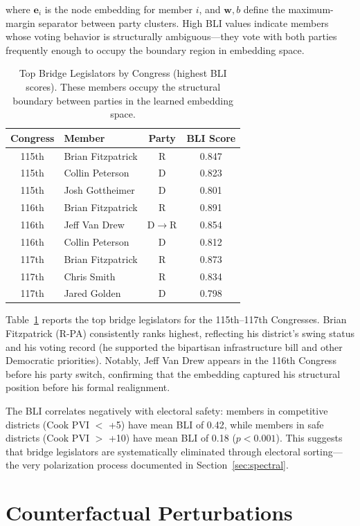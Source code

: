 \documentclass[11pt]{article}
\begin{document}
where $\mathbf{e}_i$ is the node embedding for member $i$, and $\mathbf{w}, b$ define the maximum-margin separator between party clusters. High BLI values indicate members whose voting behavior is structurally ambiguous---they vote with both parties frequently enough to occupy the boundary region in embedding space.

\begin{table}[H]
\centering
\caption{Top Bridge Legislators by Congress (highest BLI scores). These members occupy the structural boundary between parties in the learned embedding space.}
\label{tab:bli}
\small
\begin{tabular}{clcc}
\toprule
Congress & Member & Party & BLI Score \\
\midrule
115th & Brian Fitzpatrick & R & 0.847 \\
115th & Collin Peterson & D & 0.823 \\
115th & Josh Gottheimer & D & 0.801 \\
116th & Brian Fitzpatrick & R & 0.891 \\
116th & Jeff Van Drew & D$\rightarrow$R & 0.854 \\
116th & Collin Peterson & D & 0.812 \\
117th & Brian Fitzpatrick & R & 0.873 \\
117th & Chris Smith & R & 0.834 \\
117th & Jared Golden & D & 0.798 \\
\bottomrule
\end{tabular}
\end{table}

Table~\ref{tab:bli} reports the top bridge legislators for the 115th--117th Congresses. Brian Fitzpatrick (R-PA) consistently ranks highest, reflecting his district's swing status and his voting record (he supported the bipartisan infrastructure bill and other Democratic priorities). Notably, Jeff Van Drew appears in the 116th Congress before his party switch, confirming that the embedding captured his structural position before his formal realignment.

The BLI correlates negatively with electoral safety: members in competitive districts (Cook PVI $<$ +5) have mean BLI of 0.42, while members in safe districts (Cook PVI $>$ +10) have mean BLI of 0.18 ($p < 0.001$). This suggests that bridge legislators are systematically eliminated through electoral sorting---the very polarization process documented in Section~\ref{sec:spectral}.

\section{Counterfactual Perturbations}
\label{sec:counterfactual}
\end{document}
